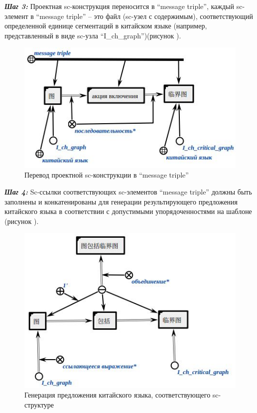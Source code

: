 \textbf{\textit{Шаг 3:}} Проектная sc-конструкция переносится в ``message triple'', каждый sc-элемент в ``message triple'' -- это файл (sc-узел с содержимым), соответствующий определенной единице сегментаций в китайском языке (например, представленный в виде sc-узла ``I\_ch\_graph'')(рисунок \textit{}).
\begin{figure}[H]
	\centering
	\includegraphics[scale=0.7]{images/part4/chapter_chinese/message_triple.png}
	\caption{Перевод проектной sc-конструкции в ``message triple''}
	\label{fig:message-triple}
\end{figure}

\textbf{\textit{Шаг 4:}} Sc-ссылки соответствующих sc-элементов ``message triple'' должны быть заполнены и конкатенированы для генерации результирующего предложения китайского языка в соответствии с допустимыми упорядоченностями на шаблоне (рисунок \textit{}).
\begin{figure}[H]
	\centering
	\includegraphics[scale=0.7]{images/part4/chapter_chinese/chinese_sentence_generated.png}
	\caption{Генерация предложения китайского языка, соответствующего sc-структуре}
	\label{fig:sentence-generated}
\end{figure}

